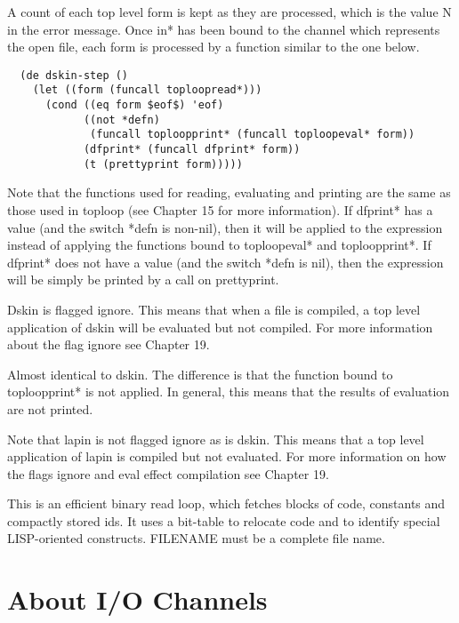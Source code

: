 A  count  of  each  top  level  form  is  kept  as  they are
processed, which is the value N in the error message.   Once
in*  has been bound to the channel which represents the open
file, each form is processed by a function  similar  to  the
one below.

\begin{verbatim}
  (de dskin-step ()
    (let ((form (funcall toploopread*)))
      (cond ((eq form $eof$) 'eof)
            ((not *defn)
             (funcall toploopprint* (funcall toploopeval* form))
            (dfprint* (funcall dfprint* form))
            (t (prettyprint form)))))
\end{verbatim}
    
Note  that  the  functions  used for reading, evaluating and
    printing are the same as those used in toploop (see  Chapter
    15  for more information).  If dfprint* has a value (and the
    switch *defn is non-nil), then it will  be  applied  to  the
    expression  instead  of  applying  the  functions  bound  to
    toploopeval* and toploopprint*.  If dfprint* does not have a
    value (and the switch *defn is  nil),  then  the  expression
    will be simply be printed by a call on prettyprint.

    Dskin  is  flagged  ignore.   This means that when a file is
    compiled, a top level application of dskin will be evaluated
    but not compiled.   For  more  information  about  the  flag
    ignore see Chapter 19.

{    Almost  identical  to  dskin. The  difference is that the
    function bound to toploopprint* is not applied.  In general,
    this means that the results of evaluation are not printed.
}

    Note that lapin is not flagged ignore as is dskin. This
    means  that a top level application of lapin is compiled but
    not evaluated.  For more information on how the flags ignore
    and eval effect compilation see Chapter 19.

{    This is an efficient binary read loop, which fetches blocks
    of  code,  constants  and  compactly  stored ids. It uses a
    bit-table to relocate code and to identify special
    LISP-oriented constructs.  FILENAME must be a complete file
    name.
}

\section{About I/O Channels}

